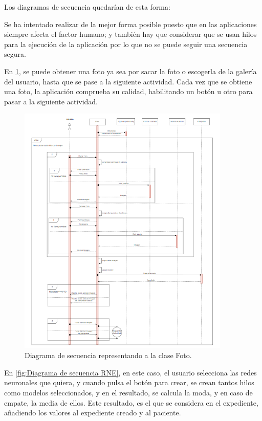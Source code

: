 Los diagramas de secuencia quedarían de esta forma:

Se ha intentado realizar de la mejor forma posible puesto que en las aplicaciones siempre afecta el factor humano; y también hay que considerar que se usan hilos para la ejecución de la aplicación por lo que no se puede seguir una secuencia segura.

En \ref{fig:Diagrama de secuencia Foto}, se puede obtener una foto ya sea por sacar la foto o escogerla de la galería del usuario, hasta que se pase a la siguiente actividad. Cada vez que se obtiene una foto, la aplicación comprueba su calidad, habilitando un botón u otro para pasar a la siguiente actividad.

\begin{figure}[!ht]
         \centering
         \includegraphics[width=0.9\textwidth]{img/Diagrama de secuencia FOTO.png}
         \caption{Diagrama de secuencia representando a la clase Foto.}
         \label{fig:Diagrama de secuencia Foto}
\end{figure}

En \ref{fig:Diagrama de secuencia RNE}, en este caso, el usuario selecciona las redes neuronales que quiera, y cuando pulsa el botón para crear, se crean tantos hilos como modelos seleccionados, y en el resultado, se calcula la moda, y en caso de empate, la media de ellos. Este resultado, es el que se considera en el expediente, añadiendo los valores al expediente creado y al paciente.

